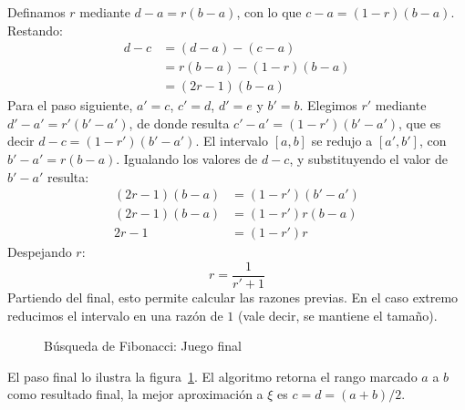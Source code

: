   Definamos \(r\) mediante \(d - a = r (b - a)\),
  con lo que \(c - a = (1 - r) (b - a)\).
  Restando:
  \begin{align*}
    d - c
      &= (d - a) - (c - a) \\
      &= r (b - a) - (1 - r) (b - a) \\
      &= (2 r  - 1) (b - a)
  \end{align*}
  Para el paso siguiente,
  \(a' = c\),
  \(c' = d\),
  \(d' = e\)
  y \(b' = b\).
  Elegimos \(r'\) mediante \(d' - a' = r' (b' - a')\),
  de donde resulta \(c' - a' = (1 - r') (b' - a')\),
  que es decir \(d - c = (1 - r') (b' - a')\).
  El intervalo \([a, b]\) se redujo a \([a', b']\),
  con \(b' - a' = r (b - a)\).
  Igualando los valores de \(d - c\),
  y substituyendo el valor de \(b' - a'\) resulta:
  \begin{align*}
    (2 r - 1) (b - a)
      &= (1 - r') (b ' - a') \\
    (2 r - 1) (b - a)
      &= (1 - r') r (b - a) \\
    2 r - 1
      &= (1 - r') r
  \end{align*}
  Despejando \(r\):
  \begin{equation}
    \label{eq:Fibonacci-search-recurrence-r}
    r = \frac{1}{r' + 1}
  \end{equation}
  Partiendo del final,
  esto permite calcular las razones previas.
  En el caso extremo reducimos el intervalo en una razón de \(1\)
  (vale decir, se mantiene el tamaño).
  \begin{figure}[htbp]
    \centering
    \caption{Búsqueda de Fibonacci: Juego final}
    \label{fig:Fibonacci-search-final}
  \end{figure}
  El paso final
  lo ilustra la figura~\ref{fig:Fibonacci-search-final}.
  El algoritmo retorna el rango marcado \(a\) a \(b\)
  como resultado final,
  la mejor aproximación a \(\xi\) es \(c = d = (a + b) / 2\).

